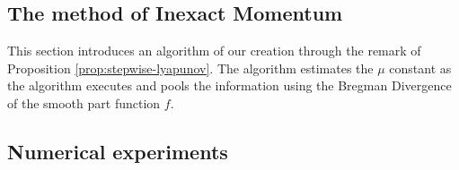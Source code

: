 \documentclass[12pt]{article}
\begin{document}
\subsection{The method of Inexact Momentum}
    This section introduces an algorithm of our creation through the remark of Proposition \ref*{prop:stepwise-lyapunov}. 
    The algorithm estimates the $\mu$ constant as the algorithm executes and pools the information using the Bregman Divergence of the smooth part function $f$. 

\subsection{Numerical experiments}






\appendix
\end{document}
